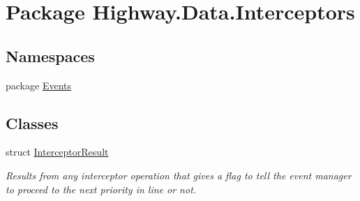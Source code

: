 \hypertarget{namespace_highway_1_1_data_1_1_interceptors}{\section{Package Highway.\-Data.\-Interceptors}
\label{namespace_highway_1_1_data_1_1_interceptors}
}
\subsection*{Namespaces}
\begin{DoxyCompactItemize}
\item 
package \hyperlink{namespace_highway_1_1_data_1_1_interceptors_1_1_events}{Events}
\end{DoxyCompactItemize}
\subsection*{Classes}
\begin{DoxyCompactItemize}
\item 
struct \hyperlink{struct_highway_1_1_data_1_1_interceptors_1_1_interceptor_result}{Interceptor\-Result}
\begin{DoxyCompactList}\small\item\em Results from any interceptor operation that gives a flag to tell the event manager to proceed to the next priority in line or not. \end{DoxyCompactList}\end{DoxyCompactItemize}
